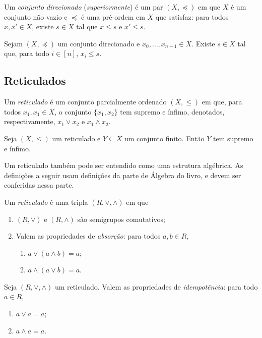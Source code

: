 \begin{definition}
Um \emph{conjunto direcionado} (\emph{superiormente}) é um par $(X,\preceq)$ em que $X$ é um conjunto não vazio e $\preceq$ é uma pré-ordem em $X$ que satisfaz: para todos $x,x' \in X$, existe $s \in X$ tal que $x \leq s$ e $x' \leq s$.
\end{definition}

\begin{proposition}
Sejam $(X,\preceq)$ um conjunto direcionado e $x_0,\ldots,x_{n-1} \in X$. Existe $s \in X$ tal que, para todo $i \in [n]$, $x_i \leq s$.
\end{proposition}

\subsection{Reticulados}

\begin{definition}
	Um \emph{reticulado} é um conjunto parcialmente ordenado $(X,\leq)$ em que, para todos $x_1, x_1 \in X$, o conjunto $\{x_1,x_2\}$ tem supremo e ínfimo, denotados, respectivamente, $x_1 \vee x_2$ e $x_1 \wedge x_2$.
\end{definition}

\begin{proposition}
	Seja $(X,\leq)$ um reticulado e $Y \subseteq X$ um conjunto finito. Então $Y$ tem supremo e ínfimo.
\end{proposition}

Um reticulado também pode ser entendido como uma estrutura algébrica. As definições a seguir usam definições da parte de Álgebra do livro, e devem ser conferidas nessa parte.

\begin{definition}
Um \emph{reticulado} é uma tripla $(R,\vee,\wedge)$ em que
	\begin{enumerate}
	\item $(R,\vee)$ e $(R,\wedge)$ são semigrupos comutativos;
	\item Valem as propriedades de \emph{absorção}: para todos $a,b \in R$, 
		\begin{enumerate}
		\item $a \vee (a \wedge b) = a$;
		\item $a \wedge (a \vee b) = a$.
		\end{enumerate}
	\end{enumerate}
\end{definition}

\begin{proposition}
Seja $(R,\vee,\wedge)$ um reticulado. Valem as propriedades de \emph{idempotência}: para todo $a \in R$,
	\begin{enumerate}
	\item $a \vee a = a$;
	\item $a \wedge a = a$.
	\end{enumerate}
\end{proposition}

